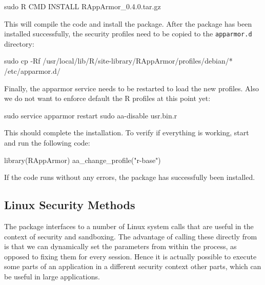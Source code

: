 \documentclass[article]{jss}
\begin{document}
\begin{CodeChunk}
\begin{CodeInput}
sudo R CMD INSTALL RAppArmor_0.4.0.tar.gz
\end{CodeInput}
\end{CodeChunk}

This will compile the  code and install the 
package. After the package has been installed successfully, the security
profiles need to be copied to the \texttt{apparmor.d} directory:

\begin{CodeChunk}
\begin{CodeInput}
sudo cp -Rf /usr/local/lib/R/site-library/RAppArmor/profiles/debian/*
/etc/apparmor.d/
\end{CodeInput}
\end{CodeChunk}

Finally, the apparmor service needs to be restarted to load the new profiles.
Also we do not want to enforce default the R profiles at this point yet:

\begin{CodeChunk}
\begin{CodeInput}
sudo service apparmor restart
sudo aa-disable usr.bin.r
\end{CodeInput}
\end{CodeChunk}

This should complete the installation. To verify if everything is working, start 
 and run the following code:

\begin{CodeChunk}
\begin{CodeInput}
library(RAppArmor)
aa_change_profile("r-base")
\end{CodeInput}
\end{CodeChunk}

If the code runs without any errors, the package has successfully been
installed.

\subsection{Linux Security Methods}

The  package interfaces to a number of Linux system calls that
are useful in the context of security and sandboxing. The advantage of calling
these directly from  is that we can dynamically set the parameters
from within the  process, as opposed to fixing them for every
 session. Hence it is actually possible to execute some parts of an
application in a different security context other parts, which can be useful in
large applications.
\end{document}
